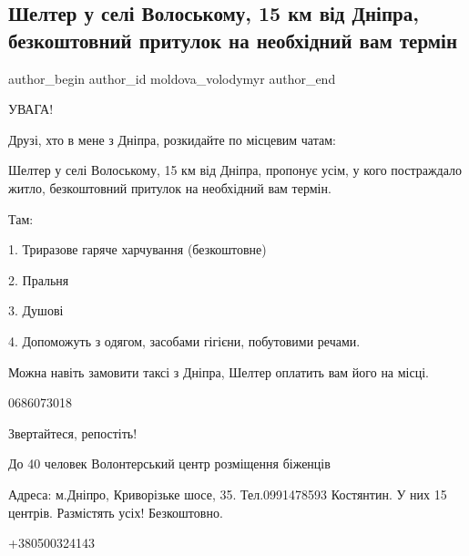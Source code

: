  
 
 
 
 

\subsection{Шелтер у селі Волоському, 15 км від Дніпра, безкоштовний притулок на необхідний вам термін}
\label{sec:15_01_2023.fb.moldova_volodymyr.1.shelter_u_sel__volos}

\ifcmt
 author_begin
   author_id moldova_volodymyr
 author_end
\fi

УВАГА! 

Друзі, хто в мене з Дніпра, розкидайте по місцевим чатам:

Шелтер у селі Волоському, 15 км від Дніпра, пропонує усім, у кого постраждало
житло, безкоштовний притулок на необхідний вам термін.

Там:

1. Триразове гаряче харчування (безкоштовне) 

2. Пральня

3. Душові

4. Допоможуть з одягом, засобами гігієни, побутовими речами.

Можна навіть замовити таксі з Дніпра, Шелтер оплатить вам його на місці.

0686073018

Звертайтеся, репостіть!

До 40 человек Волонтерський центр розміщення біженців 

Адреса: м.Дніпро, Криворізьке шосе, 35. Тел.0991478593 Костянтин.  У них 15
центрів. Размістять усіх! Безкоштовно. 

+380500324143
